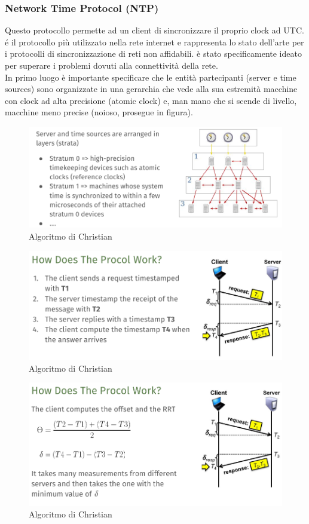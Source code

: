 \documentclass[12pt]{article}
\begin{document}
		\subsubsection{Network Time Protocol (NTP)}
			Questo protocollo permette ad un client di sincronizzare il proprio clock ad UTC. é il protocollo più utilizzato nella rete internet e rappresenta lo stato dell'arte per i protocolli di sincronizzazione di reti non affidabili. è stato specificamente ideato per superare i problemi dovuti alla connettività della rete.\\
			In primo luogo è importante specificare che le entità partecipanti (server e time sources) sono organizzate in una gerarchia che vede alla sua estremità macchine con clock ad alta precisione (atomic clock) e, man mano che si scende di livello, macchine meno precise (noioso, prosegue in figura).
			\begin{figure}[h!]
				\centering
				\includegraphics[scale=0.45]{img/hierarchy.png}
				\caption{Algoritmo di Christian}
			\end{figure}
				\begin{figure}[h!]
				\centering
				\includegraphics[scale=0.45]{img/ntp1.png}
				\caption{Algoritmo di Christian}
			\end{figure}
				\begin{figure}[h!]
				\centering
				\includegraphics[scale=0.45]{img/ntp2.png}
				\caption{Algoritmo di Christian}
			\end{figure} \newpage
\end{document}
